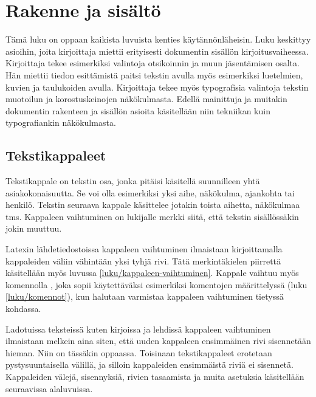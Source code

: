 
\chapter{Rakenne ja sisältö}

Tämä luku on oppaan kaikista luvuista kenties käytännönläheisin. Luku
keskittyy asioihin, joita kirjoittaja miettii erityisesti dokumentin
sisällön kirjoitusvaiheessa. Kirjoittaja tekee esimerkiksi valintoja
otsikoinnin ja muun jäsentämisen osalta. Hän miettii tiedon esittämistä
paitsi tekstin avulla myös esimerkiksi luetelmien, kuvien ja taulukoiden
avulla. Kirjoittaja tekee myös typografisia valintoja tekstin muotoilun
ja korostuskeinojen näkökulmasta. Edellä mainittuja ja muitakin
dokumentin rakenteen ja sisällön asioita käsitellään niin tekniikan kuin
typografiankin näkökulmasta.

\section{Tekstikappaleet}
\label{luku/kappale}

Tekstikappale on tekstin osa, jonka pitäisi käsitellä suunnilleen yhtä
asiakokonaisuutta. Se voi olla esimerkiksi yksi aihe, näkökulma,
ajankohta tai henkilö. Tekstin seuraava kappale käsittelee jotakin
toista aihetta, näkökulmaa tms. Kappaleen vaihtuminen on lukijalle
merkki siitä, että tekstin sisällössäkin jokin muuttuu.

Latexin lähdetiedostoissa kappaleen vaihtuminen ilmaistaan
kirjoittamalla kappaleiden väliin vähintään yksi tyhjä rivi. Tätä
merkintäkielen piirrettä käsitellään myös luvussa
\ref{luku/kappaleen-vaihtuminen}. Kappale vaihtuu myös komennolla
, joka sopii käytettäväksi esimerkiksi komentojen
määrittelyssä (luku \ref{luku/komennot}), kun halutaan varmistaa
kappaleen vaihtuminen tietyssä kohdassa.

Ladotuissa teksteissä kuten kirjoissa ja lehdissä kappaleen vaihtuminen
ilmaistaan melkein aina siten, että uuden kappaleen ensimmäinen rivi
sisennetään hieman. Niin on tässäkin oppaassa. Toisinaan tekstikappaleet
erotetaan pystysuuntaisella välillä, ja silloin kappaleiden ensimmäistä
riviä ei sisennetä. Kappaleiden välejä, sisennyksiä, rivien tasaamista
ja muita asetuksia käsitellään seuraavissa alaluvuissa.

